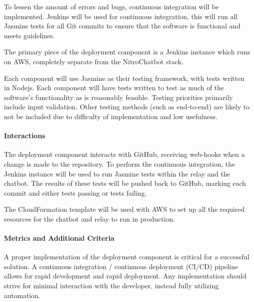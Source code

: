 To lessen the amount of errors and bugs, continuous integration will be implemented.
Jenkins\cite{jenkins} will be used for continuous integration, this will run all Jasmine tests for all Git commits to ensure that the software is functional and meets guidelines.

The primary piece of the deployment component is a Jenkins instance which runs on AWS, completely separate from the NitroChatbot stack.

Each component will use Jasmine as their testing framework, with tests written in Nodejs.
Each component will have tests written to test as much of the software's functionality as is reasonably feasible.
Testing priorities primarily include input validation.
Other testing methods (such as end-to-end) are likely to not be included due to difficulty of implementation and low usefulness.

\paragraph{Interactions}
The deployment component interacts with GitHub, receiving web-hooks when a change is made to the repository.
To perform the continuous integration, the Jenkins instance will be used to run Jasmine tests within the relay and the chatbot.
The results of these tests will be pushed back to GitHub, marking each commit and either tests passing or tests failing.

The CloudFormation template will be used with AWS to set up all the required resources for the chatbot and relay to run in production.

\paragraph{Metrics and Additional Criteria}
A proper implementation of the deployment component is critical for a successful solution.
A continuous integration / continuous deployment (CI/CD) pipeline allows for rapid development and rapid deployment.
Any implementation should strive for minimal interaction with the developer, instead fully utilizing automation.
